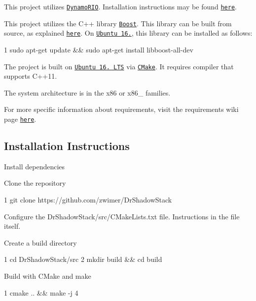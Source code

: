 \begin{DoxyEnumerate}
\item This project utilizes \href{https://github.com/DynamoRIO/dynamorio}{\tt Dynamo\+R\+IO}. Installation instructions may be found \href{https://github.com/DynamoRIO/dynamorio/wiki/How-To-Build}{\tt here}.
\item This project utilizes the C++ library \href{https://boost.org}{\tt Boost}. This library can be built from source, as explained \href{https://www.boost.org/doc/libs/1_66_0/more/getting_started/unix-variants.html}{\tt here}. On \href{http://releases.ubuntu.com/16.04.4/}{\tt Ubuntu 16.}, this library can be installed as follows\+: 
\begin{DoxyCode}
1 sudo apt-get update && sudo apt-get install libboost-all-dev
\end{DoxyCode}

\item The project is built on \href{http://releases.ubuntu.com/16.04.4/}{\tt Ubuntu 16. L\+TS} via \href{https://cmake.org/}{\tt C\+Make}. It requires compiler that supports {\ttfamily C++11}.
\item The system architecture is in the x86 or x86\+\_ families.
\end{DoxyEnumerate}

For more specific information about requirements, visit the requirements wiki page \href{https://github.com/zwimer/DrShadowStack/wiki/Requirements}{\tt here}.

\subsection*{Installation Instructions}


\begin{DoxyEnumerate}
\item Install dependencies
\item Clone the repository 
\begin{DoxyCode}
1 git clone https://github.com/zwimer/DrShadowStack
\end{DoxyCode}

\item Configure the {\ttfamily Dr\+Shadow\+Stack/src/\+C\+Make\+Lists.\+txt} file. Instructions in the file itself.
\item Create a build directory 
\begin{DoxyCode}
1 cd DrShadowStack/src
2 mkdir build && cd build
\end{DoxyCode}

\item Build with C\+Make and make 
\begin{DoxyCode}
1 cmake .. && make -j 4
\end{DoxyCode}

\end{DoxyEnumerate}

